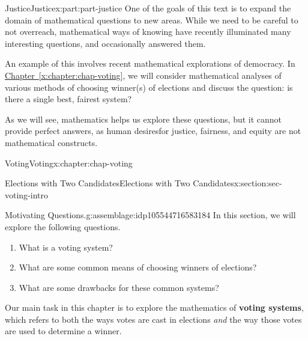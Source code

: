 \documentclass[oneside,10pt,]{book}
\newcommand{\xreffont}{\relax}
\newcommand{\terminology}[1]{\textbf{#1}}
\numberwithin{equation}{section}
\begin{document}
%
%
\typeout{************************************************}
\typeout{************************************************}
%
\begin{partptx}{Justice}{}{Justice}{}{}{x:part:part-justice}
 One of the goals of this text is to expand the domain of mathematical questions to new areas. While we need to be careful to not overreach, mathematical ways of knowing have recently illuminated many interesting questions, and occasionally answered them.%
\par
An example of this involves recent mathematical explorations of democracy. In \hyperref[x:chapter:chap-voting]{Chapter~{\xreffont\ref{x:chapter:chap-voting}}}, we will consider mathematical analyses of various methods of choosing winner(s) of elections and discuss the question: is there a single best, fairest system? %
\par
As we will see, mathematics helps us explore these questions, but it cannot provide perfect answers, as human desires\textemdash{}for justice, fairness, and equity\textemdash{} are not mathematical constructs.%
%
\typeout{************************************************}
\typeout{************************************************}
%
\begin{chapterptx}{Voting}{}{Voting}{}{}{x:chapter:chap-voting}
%
%
\typeout{************************************************}
\typeout{************************************************}
%
\begin{sectionptx}{Elections with Two Candidates}{}{Elections with Two Candidates}{}{}{x:section:sec-voting-intro}
\begin{assemblage}{Motivating Questions.}{g:assemblage:idp105544716583184}%
In this section, we will explore the following questions. %
\begin{enumerate}
\item{}What is a voting system?%
\item{}What are some common means of choosing winners of elections?%
\item{}What are some drawbacks for these common systems?%
\end{enumerate}
%
\end{assemblage}
\begin{introduction}{}%
Our main task in this chapter is to explore the mathematics of \terminology{voting systems}, which refers to both the ways votes are cast in elections \emph{and} the way those votes are used to determine a winner.%

\end{introduction}
\end{sectionptx}
\end{chapterptx}
\end{partptx}
\end{document}
